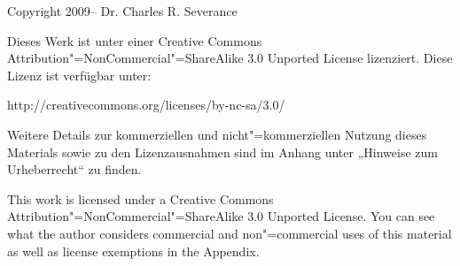 Copyright 2009--\the\year{} Dr. Charles R. Severance

Dieses Werk ist unter einer Creative Commons Attribution"=NonCommercial"=ShareAlike 3.0 Unported License lizenziert. Diese Lizenz ist verfügbar unter:

http://creativecommons.org/licenses/by-nc-sa/3.0/

Weitere Details zur kommerziellen und nicht"=kommerziellen Nutzung dieses Materials sowie zu den Lizenzausnahmen sind im Anhang unter „Hinweise zum Urheberrecht“ zu finden.

This work is licensed under a Creative Commons Attribution"=NonCommercial"=ShareAlike 3.0 Unported License. You can see what the author considers commercial and non"=commercial uses of this material as well as license exemptions in the Appendix.
